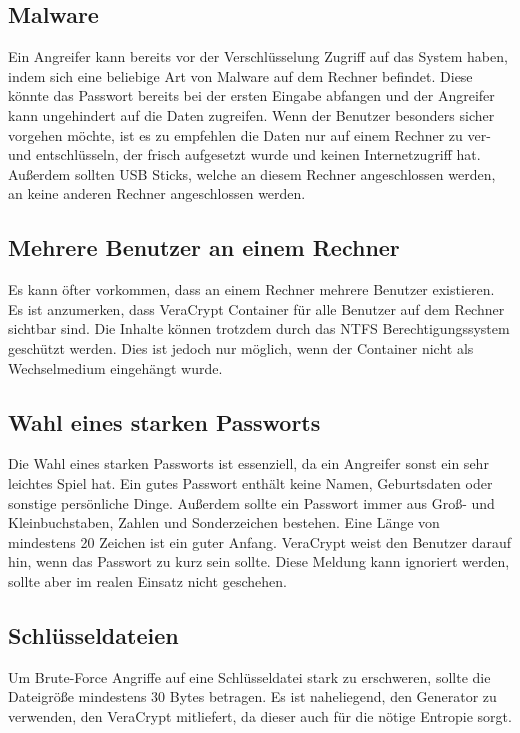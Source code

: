 \documentclass[12pt,a4paper]{scrreprt}
\begin{document}
\subsection{Malware}
Ein Angreifer kann bereits vor der Verschlüsselung Zugriff auf das System haben, indem sich eine beliebige Art von Malware auf dem Rechner befindet. Diese könnte das Passwort bereits bei der ersten Eingabe abfangen und der Angreifer kann ungehindert auf die Daten zugreifen. Wenn der Benutzer besonders sicher vorgehen möchte, ist es zu empfehlen die Daten nur auf einem Rechner zu ver- und entschlüsseln, der frisch aufgesetzt wurde und keinen Internetzugriff hat. Außerdem sollten USB Sticks, welche an diesem Rechner angeschlossen werden, an keine anderen Rechner angeschlossen werden.

\subsection{Mehrere Benutzer an einem Rechner}
Es kann öfter vorkommen, dass an einem Rechner mehrere Benutzer existieren. Es ist anzumerken, dass VeraCrypt Container für alle Benutzer auf dem Rechner sichtbar sind. Die Inhalte können trotzdem durch das NTFS Berechtigungssystem geschützt werden. Dies ist jedoch nur möglich, wenn der Container nicht als Wechselmedium eingehängt wurde.

\subsection{Wahl eines starken Passworts}
Die Wahl eines starken Passworts ist essenziell, da ein Angreifer sonst ein sehr leichtes Spiel hat. Ein gutes Passwort enthält keine Namen, Geburtsdaten oder sonstige persönliche Dinge. Außerdem sollte ein Passwort immer aus Groß- und Kleinbuchstaben, Zahlen und Sonderzeichen bestehen. Eine Länge von mindestens 20 Zeichen ist ein guter Anfang. VeraCrypt weist den Benutzer darauf hin, wenn das Passwort zu kurz sein sollte. Diese Meldung kann ignoriert werden, sollte aber im realen Einsatz nicht geschehen.

\subsection{Schlüsseldateien}
Um Brute-Force Angriffe auf eine Schlüsseldatei stark zu erschweren, sollte die Dateigröße mindestens 30 Bytes betragen. Es ist naheliegend, den Generator zu verwenden, den VeraCrypt mitliefert, da dieser auch für die nötige Entropie sorgt.
\end{document}
